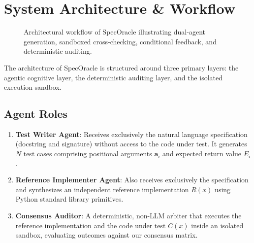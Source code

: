 \documentclass[conference]{IEEEtran}
\begin{document}
\section{System Architecture \& Workflow}

\begin{figure}[t]
\centering
{}
\caption{Architectural workflow of SpecOracle illustrating dual-agent generation, sandboxed cross-checking, conditional feedback, and deterministic auditing.}
\label{fig:architecture}
\end{figure}

The architecture of SpecOracle is structured around three primary layers: the agentic cognitive layer, the deterministic auditing layer, and the isolated execution sandbox.

\subsection{Agent Roles}
\begin{enumerate}
    \item \textbf{Test Writer Agent}: Receives exclusively the natural language specification (docstring and signature) without access to the code under test. It generates $N$ test cases comprising positional arguments $\mathbf{a}_i$ and expected return value $E_i$.
    \item \textbf{Reference Implementer Agent}: Also receives exclusively the specification and synthesizes an independent reference implementation $R(x)$ using Python standard library primitives.
    \item \textbf{Consensus Auditor}: A deterministic, non-LLM arbiter that executes the reference implementation and the code under test $C(x)$ inside an isolated sandbox, evaluating outcomes against our consensus matrix.
\end{enumerate}
\end{document}
